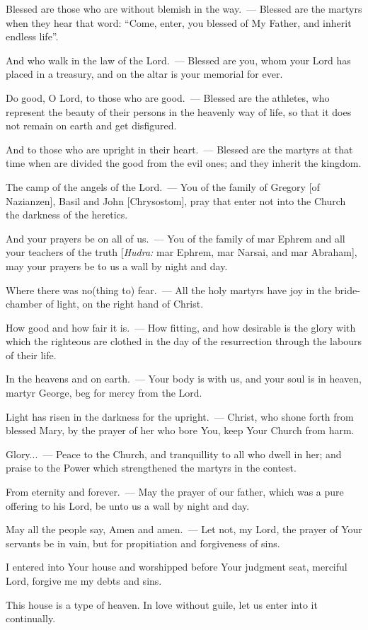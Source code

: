 \documentclass[12pt,twoside,a5paper]{article}
\begin{document}
\begin{halfparskip}
  Blessed are those who are without blemish in the way.~--- Blessed are the martyrs when they hear that word: ``Come, enter, you blessed of My Father, and inherit endless life''.

  And who walk in the law of the Lord.~--- Blessed are you, whom your Lord has placed in a treasury, and on the altar is your memorial for ever.

  Do good, O Lord, to those who are good.~--- Blessed are the athletes, who represent the beauty of their persons in the heavenly way of life, so that it does not remain on earth and get disfigured.

  And to those who are upright in their heart.~--- Blessed are the martyrs at that time when are divided the good from the evil ones; and they inherit the kingdom.

  The camp of the angels of the Lord.~--- You of the family of Gregory [of Nazianzen], Basil and John [Chrysostom], pray that enter not into the Church the darkness of the heretics.

  And your prayers be on all of us.~--- You of the family of mar Ephrem and all your teachers of the truth [\emph{Hudra:} mar Ephrem, mar Narsai, and mar Abraham], may your prayers be to us a wall by night and day.

  Where there was no(thing to) fear.~--- All the holy martyrs have joy in the bride-chamber of light, on the right hand of Christ.

  How good and how fair it is.~--- How fitting, and how desirable is the glory with which the righteous are clothed in the day of the resurrection through the labours of their life.

  In the heavens and on earth.~--- Your body is with us, and your soul is in heaven, martyr George, beg for mercy from the Lord.

  Light has risen in the darkness for the upright.~--- Christ, who shone forth from blessed Mary, by the prayer of her who bore You, keep Your Church from harm.

  Glory...~--- Peace to the Church, and tranquillity to all who dwell in her; and praise to the Power which strengthened the martyrs in the contest.

  From eternity and forever.~--- May the prayer of our father, which was a pure offering to his Lord, be unto us a wall by night and day.

  May all the people say, Amen and amen.~--- Let not, my Lord, the prayer of Your servants be in vain, but for propitiation and forgiveness of sins.

  I entered into Your house and worshipped before Your judgment seat, merciful Lord, forgive me my debts and sins.

  This house is a type of heaven. In love without guile, let us enter into it continually.
\end{halfparskip}
\end{document}
